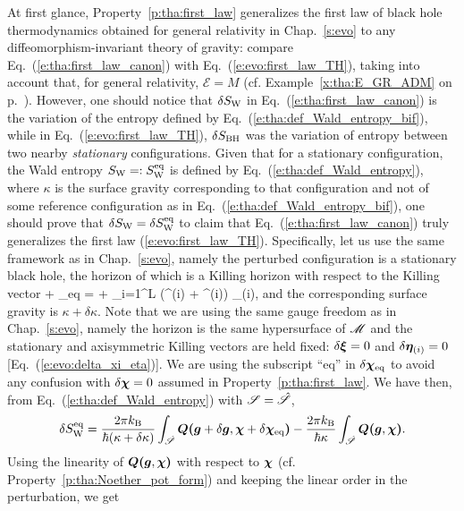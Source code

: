 At first glance, Property~\ref{p:tha:first_law} generalizes the first law of
black hole thermodynamics obtained for general relativity in Chap.~\ref{s:evo}
to any diffeomorphism-invariant theory of gravity:
compare Eq.~(\ref{e:tha:first_law_canon}) with
Eq.~(\ref{e:evo:first_law_TH}), taking into account that, for general relativity,
$\mathcal{E} = M$ (cf. Example~\ref{x:tha:E_GR_ADM} on p.~\pageref{x:tha:E_GR_ADM}).
However, one should
notice that $\delta S_{\rm W}$ in Eq.~(\ref{e:tha:first_law_canon}) is the variation of the entropy defined
by Eq.~(\ref{e:tha:def_Wald_entropy_bif}), while in Eq.~(\ref{e:evo:first_law_TH}),
$\delta S_{\rm BH}$ was the variation of entropy between two nearby
\emph{stationary} configurations. Given that for a stationary configuration,
the Wald entropy $S_{\rm W} =: S_{\rm W}^{\rm eq}$
is defined by Eq.~(\ref{e:tha:def_Wald_entropy}), where
$\kappa$ is the surface gravity corresponding to that configuration and not of
some reference configuration as in Eq.~(\ref{e:tha:def_Wald_entropy_bif}),
one should prove that $\delta S_{\rm W} = \delta S_{\rm W}^{\rm eq}$
to claim that Eq.~(\ref{e:tha:first_law_canon}) truly generalizes
the first law (\ref{e:evo:first_law_TH}). Specifically, let us use the
same framework as in Chap.~\ref{s:evo}, namely the perturbed configuration
is a stationary black hole, the horizon of which is a Killing horizon with
respect to the Killing vector
\be \label{e:tha:chi_delta_chi}
    \w{\chi} + \delta\w{\chi}_{\rm eq} = \w{\xi} + \sum_{i=1}^{L} (\Omega^{(i)} + \delta\Omega^{(i)}) \w{\eta}_{(i)},
\ee
and the corresponding surface gravity is $\kappa+\delta\kappa$. Note that we are using the
same gauge freedom as in Chap.~\ref{s:evo}, namely the horizon is the same
hypersurface of $\mathscr{M}$ and the stationary and axisymmetric Killing vectors are
held fixed: $\delta\bm{\xi} = 0$ and $\delta\bm{\eta}_{(i)} = 0$ [Eq.~(\ref{e:evo:delta_xi_eta})].
We are using the subscript ``eq'' in $\delta\bm{\chi}_{\rm eq}$ to avoid any confusion
with $\delta\bm{\chi} = 0$ assumed in Property~\ref{p:tha:first_law}.
We have then, from Eq.~(\ref{e:tha:def_Wald_entropy}) with $\mathscr{S} = \hat{\mathscr{S}}$,
\[
     \delta S_{\rm W}^{\rm eq} = \frac{2 \pi k_{\rm B}}{\hbar(\kappa+\delta\kappa)}
     \int_{\hat{\mathscr{S}}} \bm{Q}\textbf{(}\bm{g} + \delta\bm{g},\bm{\chi} + \delta\bm{\chi}_{\rm eq}\textbf{)}
     - \frac{2 \pi k_{\rm B}}{\hbar\kappa}
     \int_{\hat{\mathscr{S}}} \bm{Q}\textbf{(}\bm{g},\bm{\chi}\textbf{)} .
\]
Using the linearity of $\bm{Q}\textbf{(}\bm{g},\bm{\chi}\textbf{)}$ with respect to $\bm{\chi}$
(cf. Property~\ref{p:tha:Noether_pot_form}) and keeping the linear order in the
perturbation, we get
